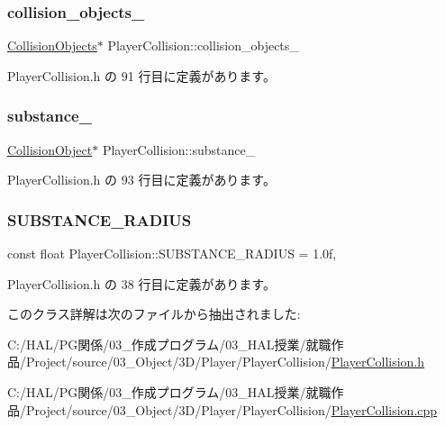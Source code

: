 \subsubsection{\texorpdfstring{collision\+\_\+objects\+\_\+}{collision\_objects\_}}
{\footnotesize\ttfamily \mbox{\hyperlink{class_collision_objects}{Collision\+Objects}}$\ast$ Player\+Collision\+::collision\+\_\+objects\+\_\+\hspace{0.3cm}{\ttfamily [private]}}



 Player\+Collision.\+h の 91 行目に定義があります。

\mbox{\label{class_player_collision_a96ea29b4d3b42d6e3bba7f609ba9f1ea}} 
\subsubsection{\texorpdfstring{substance\+\_\+}{substance\_}}
{\footnotesize\ttfamily \mbox{\hyperlink{class_collision_object}{Collision\+Object}}$\ast$ Player\+Collision\+::substance\+\_\+\hspace{0.3cm}{\ttfamily [private]}}



 Player\+Collision.\+h の 93 行目に定義があります。

\mbox{\label{class_player_collision_ab6bab4a28016089c86a90d3f77f46fdf}} 
\subsubsection{\texorpdfstring{S\+U\+B\+S\+T\+A\+N\+C\+E\+\_\+\+R\+A\+D\+I\+US}{SUBSTANCE\_RADIUS}}
{\footnotesize\ttfamily const float Player\+Collision\+::\+S\+U\+B\+S\+T\+A\+N\+C\+E\+\_\+\+R\+A\+D\+I\+US = 1.\+0f\hspace{0.3cm}{\ttfamily [static]}, {\ttfamily [private]}}



 Player\+Collision.\+h の 38 行目に定義があります。



このクラス詳解は次のファイルから抽出されました\+:\begin{DoxyCompactItemize}
\item 
C\+:/\+H\+A\+L/\+P\+G関係/03\+\_\+作成プログラム/03\+\_\+\+H\+A\+L授業/就職作品/\+Project/source/03\+\_\+\+Object/3\+D/\+Player/\+Player\+Collision/\mbox{\hyperlink{_player_collision_8h}{Player\+Collision.\+h}}\item 
C\+:/\+H\+A\+L/\+P\+G関係/03\+\_\+作成プログラム/03\+\_\+\+H\+A\+L授業/就職作品/\+Project/source/03\+\_\+\+Object/3\+D/\+Player/\+Player\+Collision/\mbox{\hyperlink{_player_collision_8cpp}{Player\+Collision.\+cpp}}\end{DoxyCompactItemize}
